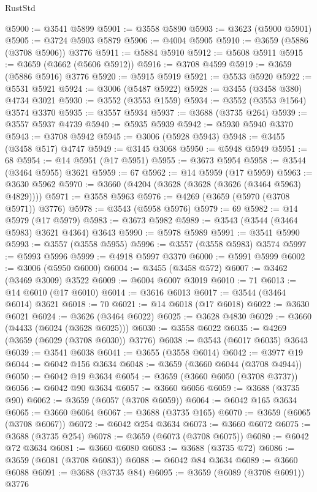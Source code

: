 \begin{lexlean}{RustStd}
\begin{coremodule}
@5900 := @3541 @5899
@5901 := @3558 @5890
@5903 := @3623 (@5900 @5901)
@5905 := @3724 @5903 @5879
@5906 := @4004 @5905
@5910 := @3659 (@5886 (@3708 @5906)) @3776
@5911 := @5884 @5910
@5912 := @5608 @5911
@5915 := @3659 (@3662 (@5606 @5912))
@5916 := @3708 @4599
@5919 := @3659 (@5886 @5916) @3776
@5920 := @5915 @5919
@5921 := @5533 @5920
@5922 := @5531 @5921
@5924 := @3006 (@5487 @5922)
@5928 := @3455 (@3458 @380) @4734 @3021
@5930 := @3552 (@3553 @1559)
@5934 := @3552 (@3553 @1564) @3574 @3370
@5935 := @3557 @5934
@5937 := @3688 (@3735 @264)
@5939 := @3557 @5937 @4739
@5940 := @5935 @5939
@5942 := @5930 @5940 @3370
@5943 := @3708 @5942
@5945 := @3006 (@5928 @5943)
@5948 := @3455 (@3458 @517) @4747
@5949 := @3145 @3068
@5950 := @5948 @5949
@5951 := 68
@5954 := @14 @5951 (@17 @5951)
@5955 := @3673 @5954
@5958 := @3544 (@3464 @5955) @3621
@5959 := 67
@5962 := @14 @5959 (@17 @5959)
@5963 := @3630 @5962
@5970 := @3660 (@4204 (@3628 (@3628 (@3626 (@3464 @5963) @4829))))
@5971 := @3558 @5963
@5976 := @4269 (@3659 (@5970 (@3708 @5971)) @3776)
@5978 := @3543 (@5958 @5976)
@5979 := 69
@5982 := @14 @5979 (@17 @5979)
@5983 := @3673 @5982
@5989 := @3543 (@3544 (@3464 @5983) @3621 @4364) @3643
@5990 := @5978 @5989
@5991 := @3541 @5990
@5993 := @3557 (@3558 @5955)
@5996 := @3557 (@3558 @5983) @3574
@5997 := @5993 @5996
@5999 := @4918 @5997 @3370
@6000 := @5991 @5999
@6002 := @3006 (@5950 @6000)
@6004 := @3455 (@3458 @572)
@6007 := @3462 (@3469 @3009) @3522
@6009 := @6004 @6007 @3019
@6010 := 71
@6013 := @14 @6010 (@17 @6010)
@6014 := @3616 @6013
@6017 := @3544 (@3464 @6014) @3621
@6018 := 70
@6021 := @14 @6018 (@17 @6018)
@6022 := @3630 @6021
@6024 := @3626 (@3464 @6022)
@6025 := @3628 @4830
@6029 := @3660 (@4433 (@6024 (@3628 @6025)))
@6030 := @3558 @6022
@6035 := @4269 (@3659 (@6029 (@3708 @6030)) @3776)
@6038 := @3543 (@6017 @6035) @3643
@6039 := @3541 @6038
@6041 := @3655 (@3558 @6014)
@6042 := @3977 @19
@6044 := @6042 @156 @3634
@6048 := @3659 (@3660 @6044 (@3708 @4944))
@6050 := @6042 @19 @3634
@6054 := @3659 (@3660 @6050 (@3708 @3737))
@6056 := @6042 @90 @3634
@6057 := @3660 @6056
@6059 := @3688 (@3735 @90)
@6062 := @3659 (@6057 (@3708 @6059))
@6064 := @6042 @165 @3634
@6065 := @3660 @6064
@6067 := @3688 (@3735 @165)
@6070 := @3659 (@6065 (@3708 @6067))
@6072 := @6042 @254 @3634
@6073 := @3660 @6072
@6075 := @3688 (@3735 @254)
@6078 := @3659 (@6073 (@3708 @6075))
@6080 := @6042 @72 @3634
@6081 := @3660 @6080
@6083 := @3688 (@3735 @72)
@6086 := @3659 (@6081 (@3708 @6083))
@6088 := @6042 @84 @3634
@6089 := @3660 @6088
@6091 := @3688 (@3735 @84)
@6095 := @3659 (@6089 (@3708 @6091)) @3776

\end{coremodule}
\end{lexlean}
